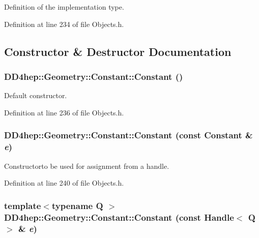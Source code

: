 Definition of the implementation type. 

Definition at line 234 of file Objects.h.

\subsection{Constructor \& Destructor Documentation}
\hypertarget{class_d_d4hep_1_1_geometry_1_1_constant_a4f9e9cc06e1b01401343b855a8c03b9a}{
\subsubsection[{Constant}]{\setlength{\rightskip}{0pt plus 5cm}DD4hep::Geometry::Constant::Constant ()}}
\label{class_d_d4hep_1_1_geometry_1_1_constant_a4f9e9cc06e1b01401343b855a8c03b9a}


Default constructor. 

Definition at line 236 of file Objects.h.\hypertarget{class_d_d4hep_1_1_geometry_1_1_constant_af3b65056d896ad0554a58d9160c3d358}{
\subsubsection[{Constant}]{\setlength{\rightskip}{0pt plus 5cm}DD4hep::Geometry::Constant::Constant (const {\bf Constant} \& {\em e})}}
\label{class_d_d4hep_1_1_geometry_1_1_constant_af3b65056d896ad0554a58d9160c3d358}


Constructorto be used for assignment from a handle. 

Definition at line 240 of file Objects.h.\hypertarget{class_d_d4hep_1_1_geometry_1_1_constant_a963a81eb77feeb0ecf30eb957c15c639}{
\subsubsection[{Constant}]{\setlength{\rightskip}{0pt plus 5cm}template$<$typename Q $>$ DD4hep::Geometry::Constant::Constant (const {\bf Handle}$<$ Q $>$ \& {\em e})}}
\label{class_d_d4hep_1_1_geometry_1_1_constant_a963a81eb77feeb0ecf30eb957c15c639}


